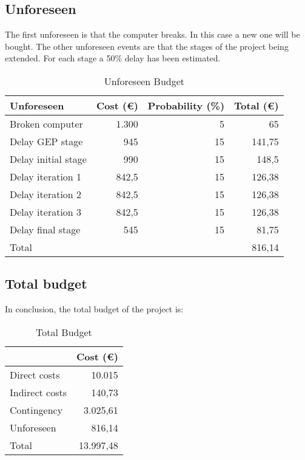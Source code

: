 \subsection{Unforeseen}
The first unforeseen is that the computer breaks. In this case a new one will be bought. The other unforeseen events are that the stages of the project being extended. For each stage a 50\% delay has been estimated.
\begin{table}[h!]
	\centering
	\begin{tabular}{|l|r|r|r|}
		\hline
		Unforeseen & \multicolumn{1}{l|}{Cost (€)} & \multicolumn{1}{l|}{Probability (\%)} & \multicolumn{1}{l|}{Total (€)} \\ \hline
		Broken computer & 1.300 & 5 & 65 \\ \hline
		Delay GEP stage & 945 & 15 & 141,75\\ \hline
		Delay initial stage & 990 & 15 & 148,5\\ \hline
		Delay iteration 1 & 842,5 & 15 & 126,38\\ \hline
		Delay iteration 2 & 842,5 & 15 & 126,38\\ \hline
		Delay iteration 3 & 842,5 & 15 & 126,38\\ \hline
		Delay final stage & 545 & 15 & 81,75\\ \hline\hline
		Total & \multicolumn{3}{r|}{816,14} \\ \hline
	\end{tabular}
	\caption{Unforeseen Budget}
	\label{Unforeseen}
\end{table}

\subsection{Total budget}
In conclusion, the total budget of the project is:
\begin{table}[h!]
	\centering
	\begin{tabular}{l|r|}
		\cline{2-2}
		& \multicolumn{1}{l|}{Cost (€)} \\ \hline
		\multicolumn{1}{|l|}{Direct costs} & 10.015\\ \hline
		\multicolumn{1}{|l|}{Indirect costs}& 140,73\\ \hline
		\multicolumn{1}{|l|}{Contingency} & 3.025,61\\ \hline
		\multicolumn{1}{|l|}{Unforeseen} & 816,14\\ \hline\hline
		\multicolumn{1}{|l|}{Total} & 13.997,48\\ \hline
	\end{tabular}
	\caption{Total Budget}
	\label{TotalBudget}
\end{table}
